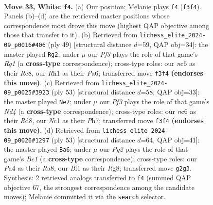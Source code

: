 \documentclass[11pt]{article}
\begin{document}
\clearpage

\begin{figure}[p]\centering
\begin{subfigure}{0.46\textwidth}\centering
\resizebox{\linewidth}{!}{%
\newchessgame
\chessboard[
  setfen={5r2/4r1k1/ppn5/2p1pbp1/P7/2P2P2/1K4PP/2N1RBNR w - - 0 33},
  showmover=false,
  pgfstyle=straightmove, color=movearrow, markmove={f3-f4}
]}
\caption{}
\end{subfigure}\hfill
\begin{subfigure}{0.46\textwidth}\centering
\resizebox{\linewidth}{!}{%
\newchessgame
\chessboard[
  setfen={2rbk1r1/5p2/p1p1p3/4Pn2/2R1NP1p/8/PP3B1P/1K5R b - - 0 25},
  showmover=false,
  pgfstyle=straightmove, color=movearrow, markmove={g8-g2}
]}
\caption{}
\end{subfigure}
\\[4pt]
\begin{subfigure}{0.46\textwidth}\centering
\resizebox{\linewidth}{!}{%
\newchessgame
\chessboard[
  setfen={3r2k1/5ppp/4p3/1r1n4/3b4/pP1N4/P2B1PPP/1RR2K2 b - - 5 27},
  showmover=false,
  pgfstyle=straightmove, color=movearrow, markmove={d5-e7}
]}
\caption{}
\end{subfigure}\hfill
\begin{subfigure}{0.46\textwidth}\centering
\resizebox{\linewidth}{!}{%
\newchessgame
\chessboard[
  setfen={r1b3r1/p3kn2/1pp1pp2/8/4P2P/PBPN4/2P1RKP1/7R b - - 1 27},
  showmover=false,
  pgfstyle=straightmove, color=movearrow, markmove={c8-a6}
]}
\caption{}
\end{subfigure}
\caption{\textbf{Move 33, White: \texttt{f4}.} (a) Our position; Melanie plays \texttt{f4} (\texttt{f3f4}). Panels (b)--(d) are the retrieved master positions whose correspondence most drove this move (highest QAP objective among those that transfer to it). (b) Retrieved from \texttt{lichess\_elite\_2024-09\_p0016\#406} (ply 49) [structural distance $d$=59, QAP obj=34]: the master played \texttt{Rg2}; under $\mu$ our \emph{Pf3} plays the role of that game's \emph{Rg1} (a \textbf{cross-type} correspondence); cross-type roles: our \emph{n}c6 as their \emph{R}c8, our \emph{R}h1 as their \emph{P}a6; transferred move \texttt{f3f4} \textbf{(endorses this move)}. (c) Retrieved from \texttt{lichess\_elite\_2024-09\_p0025\#3923} (ply 53) [structural distance $d$=58, QAP obj=33]: the master played \texttt{Ne7}; under $\mu$ our \emph{Pf3} plays the role of that game's \emph{Nd4} (a \textbf{cross-type} correspondence); cross-type roles: our \emph{n}c6 as their \emph{R}d8, our \emph{N}c1 as their \emph{P}h7; transferred move \texttt{f3f4} \textbf{(endorses this move)}. (d) Retrieved from \texttt{lichess\_elite\_2024-09\_p0026\#1297} (ply 53) [structural distance $d$=64, QAP obj=41]: the master played \texttt{Ba6}; under $\mu$ our \emph{Pg2} plays the role of that game's \emph{Bc1} (a \textbf{cross-type} correspondence); cross-type roles: our \emph{P}a4 as their \emph{R}a8, our \emph{B}f1 as their \emph{R}g8; transferred move \texttt{g2g3}. Synthesis: 2 retrieved analogs transferred to \texttt{f4} (summed QAP objective 67, the strongest correspondence among the candidate moves); Melanie committed it via the \texttt{search} selector.}
\label{fig:thought-m64}
\end{figure}
\end{document}
